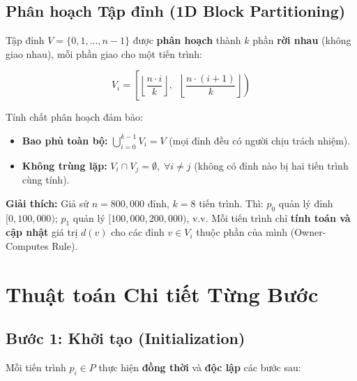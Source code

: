 \documentclass[12pt,a4paper]{article}
\begin{document}
\subsection{Phân hoạch Tập đỉnh (1D Block Partitioning)}

Tập đỉnh $V = \{0, 1, \ldots, n-1\}$ được \textbf{phân hoạch} thành $k$ phần \textbf{rời nhau} (không giao nhau), mỗi phần giao cho một tiến trình:

\begin{equation}
V_i = \left[\left\lfloor \frac{n \cdot i}{k} \right\rfloor, \;\; \left\lfloor \frac{n \cdot (i+1)}{k} \right\rfloor \right)
\end{equation}

Tính chất phân hoạch đảm bảo:
\begin{itemize}
  \item \textbf{Bao phủ toàn bộ:} $\displaystyle\bigcup_{i=0}^{k-1} V_i = V$ (mọi đỉnh đều có người chịu trách nhiệm).
  \item \textbf{Không trùng lặp:} $V_i \cap V_j = \emptyset, \;\forall i \neq j$ (không có đỉnh nào bị hai tiến trình cùng tính).
\end{itemize}

\begin{explain}
\textbf{Giải thích:} Giả sử $n = 800{,}000$ đỉnh, $k = 8$ tiến trình. Thì: $p_0$ quản lý đỉnh $[0, 100{,}000)$; $p_1$ quản lý $[100{,}000, 200{,}000)$, v.v. Mỗi tiến trình chỉ \textbf{tính toán và cập nhật} giá trị $d(v)$ cho các đỉnh $v \in V_i$ thuộc phần của mình (Owner-Computes Rule).
\end{explain}

\section{Thuật toán Chi tiết Từng Bước}

\subsection{Bước 1: Khởi tạo (Initialization)}

Mỗi tiến trình $p_i \in P$ thực hiện \textbf{đồng thời} và \textbf{độc lập} các bước sau:
\end{document}
